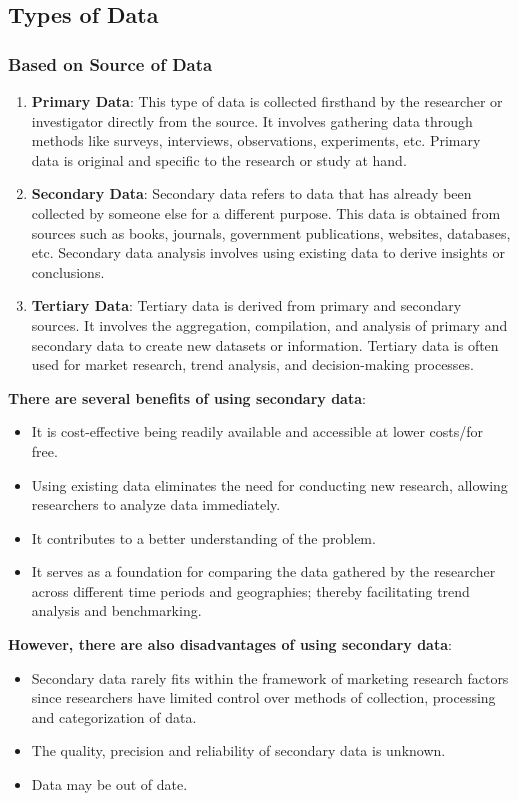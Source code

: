 \documentclass{article}
\begin{document}
\subsection{Types of Data}
\subsubsection{Based on Source of Data}
\begin{enumerate}
    \item \textbf{Primary Data}: This type of data is collected firsthand by the researcher or investigator directly from the source. It involves gathering data through methods like surveys, interviews, observations, experiments, etc. Primary data is original and specific to the research or study at hand.

    \item \textbf{Secondary Data}: Secondary data refers to data that has already been collected by someone else for a different purpose. This data is obtained from sources such as books, journals, government publications, websites, databases, etc. Secondary data analysis involves using existing data to derive insights or conclusions.

    \item \textbf{Tertiary Data}: Tertiary data is derived from primary and secondary sources. It involves the aggregation, compilation, and analysis of primary and secondary data to create new datasets or information. Tertiary data is often used for market research, trend analysis, and decision-making processes.
\end{enumerate}
\bigskip

\noindent \textbf{There are several benefits of using secondary data}:
\begin{itemize}
    \item It is cost-effective being readily available and accessible at lower costs/for free.
    \item Using existing data eliminates the need for conducting new research, allowing researchers to analyze data immediately.
    \item It contributes to a better understanding of the problem.
    \item It serves as a foundation for comparing the data gathered by the researcher across different time periods and geographies; thereby facilitating trend analysis and benchmarking.
\end{itemize}

\noindent \textbf{However, there are also disadvantages of using secondary data}:
\begin{itemize}
    \item Secondary data rarely fits within the framework of marketing research factors since researchers have limited control over methods of collection, processing and categorization of data.
    \item The quality, precision and reliability of secondary data is unknown.
    \item Data may be out of date.
\end{itemize}
\end{document}
